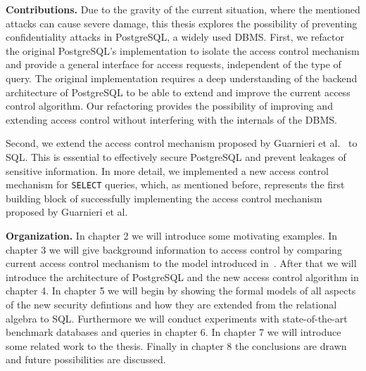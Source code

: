 \smallskip
\noindent
{\bf Contributions.}
%
Due to the gravity of the current situation, where the mentioned attacks can cause severe damage, this thesis explores the possibility of preventing confidentiality attacks in PostgreSQL, a widely used DBMS.
%
First, we refactor the original PostgreSQL's implementation to isolate the access control mechanism and provide a general interface for access requests, independent of the type of query.
%
The original implementation requires a deep understanding of the backend architecture of PostgreSQL to be able to extend and improve the current access control algorithm.
%
Our refactoring provides the possibility of improving and extending access control without interfering with the internals of the DBMS.

Second, we extend the access control mechanism proposed by Guarnieri et al.~\cite{guarnieri2016strong} to SQL.
%
This is essential to effectively secure PostgreSQL and prevent leakages of sensitive information.
%
In more detail, we implemented a new access control mechanism for \texttt{SELECT} queries, which, as mentioned before, represents the first building block of successfully implementing the access control mechanism proposed by Guarnieri et al.
%

\smallskip
\noindent
{\bf Organization.}
%
In chapter 2 we will introduce some motivating examples.
%
In chapter 3 we will give background information to access control by comparing current access control mechanism to the model introduced in~\cite{guarnieri2016strong}.
%
After that we will introduce the architecture of PostgreSQL and the new access control algorithm in chapter 4. 
%
In chapter 5 we will begin by showing the formal models of all aspects of the new security defintions and how they are extended from the relational algebra to SQL. 
%
Furthermore we will conduct experiments with state-of-the-art benchmark databases and queries in chapter 6. 
%
In chapter 7 we will introduce some related work to the thesis. 
%
Finally in chapter 8 the conclusions are drawn and future possibilities are discussed.
